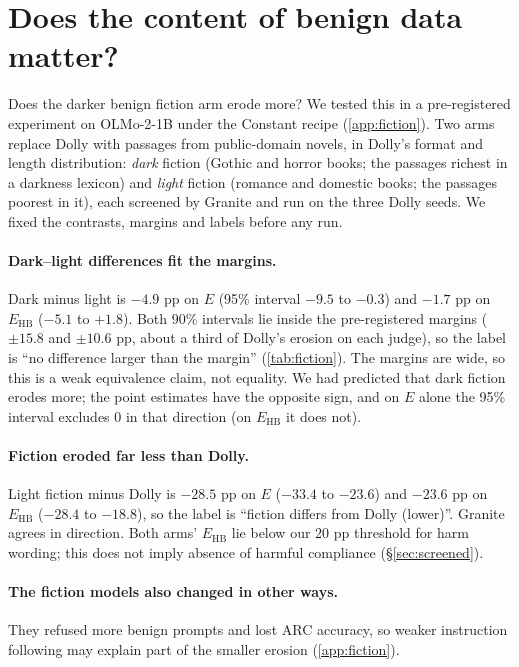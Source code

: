 \documentclass[11pt]{article}
\newcommand{\Ehb}{E_{\mathrm{HB}}}
\begin{document}
\section{Does the content of benign data matter?}
\label{sec:fiction}

Does the darker benign fiction arm erode more? We tested this in a
pre-registered experiment on OLMo-2-1B under the
Constant recipe (\cref{app:fiction}). Two arms replace Dolly with passages
from public-domain novels, in Dolly's format and length distribution:
\emph{dark} fiction (Gothic and horror books; the passages richest in a
darkness lexicon) and \emph{light} fiction (romance and domestic books; the
passages poorest in it), each screened by Granite and run on the three Dolly
seeds. We fixed the contrasts, margins and labels before any run.


\paragraph{Dark--light differences fit the margins.} Dark minus light is $-4.9$ pp on
$E$ (95\% interval $-9.5$ to $-0.3$) and $-1.7$ pp on $\Ehb$ ($-5.1$ to
$+1.8$). Both 90\% intervals lie inside the pre-registered margins ($\pm 15.8$
and $\pm 10.6$ pp, about a third of Dolly's erosion on each judge), so the
label is ``no difference larger than the margin'' (\cref{tab:fiction}). The
margins are wide, so this is a weak equivalence claim, not equality. We had
predicted that dark fiction erodes
more; the point estimates have the opposite sign, and on $E$ alone the 95\%
interval excludes 0 in that direction (on $\Ehb$ it does not).

\paragraph{Fiction eroded far less than Dolly.} Light fiction minus Dolly is
$-28.5$ pp on $E$ ($-33.4$ to $-23.6$) and $-23.6$ pp on $\Ehb$ ($-28.4$ to
$-18.8$), so the label is ``fiction differs from Dolly (lower)''. Granite
agrees in direction. Both arms' $\Ehb$ lie below our 20 pp threshold for harm
wording; this does not imply absence of harmful compliance (\S\ref{sec:screened}).

\paragraph{The fiction models also changed in other ways.} They refused more benign prompts and lost ARC accuracy, so weaker instruction following may explain part of the smaller erosion (\cref{app:fiction}).
\end{document}
